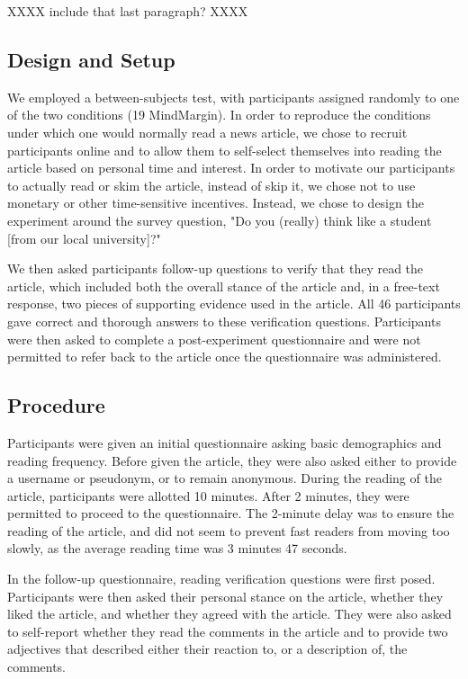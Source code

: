 XXXX include that last paragraph? XXXX

\subsection{Design and Setup}
We employed a between-subjects test, with participants assigned randomly to one of the two conditions (19 MindMargin). In order to reproduce the conditions under which one would normally read a news article, we chose to recruit participants online and to allow them to self-select themselves into reading the article based on personal time and interest. In order to motivate our participants to actually read or skim the article, instead of skip it, we chose not to use monetary or other time-sensitive incentives. Instead, we chose to design the experiment around the survey question, "Do you (really) think like a student [from our local university]?" 

We then asked participants follow-up questions to verify that they read the article, which included both the overall stance of the article and, in a free-text response, two pieces of supporting evidence used in the article. All 46 participants gave correct and thorough answers to these verification questions. Participants were then asked to complete a post-experiment questionnaire and were not permitted to refer back to the article once the questionnaire was administered.

\subsection{Procedure}
Participants were given an initial questionnaire asking basic demographics and reading frequency. Before given the article, they were also asked either to provide a username or pseudonym, or to remain anonymous. During the reading of the article, participants were allotted 10 minutes. After 2 minutes, they were permitted to proceed to the questionnaire. The 2-minute delay was to ensure the reading of the article, and did not seem to prevent fast readers from moving too slowly, as the average reading time was 3 minutes 47 seconds. 

In the follow-up questionnaire, reading verification questions were first posed. Participants were then asked their personal stance on the article, whether they liked the article, and whether they agreed with the article. They were also asked to self-report whether they read the comments in the article and to provide two adjectives that described either their reaction to, or a description of, the comments.
